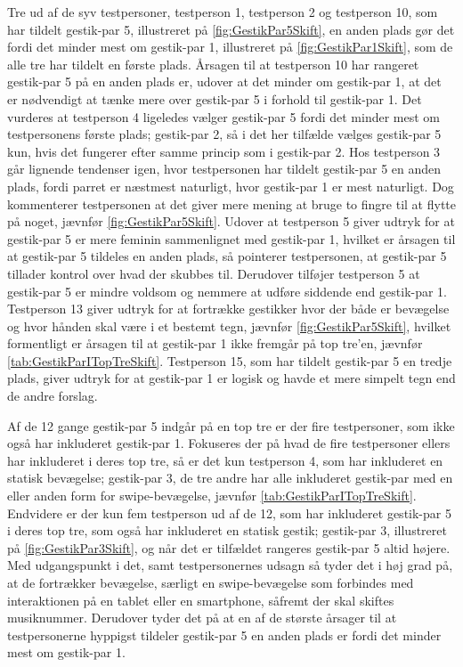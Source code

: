 Tre ud af de syv testpersoner, testperson 1, testperson 2 og testperson 10, som har tildelt gestik-par 5, illustreret på \autoref{fig:GestikPar5Skift}, en anden plads gør det fordi det minder mest om gestik-par 1, illustreret på \autoref{fig:GestikPar1Skift}, som de alle tre har tildelt en første plads. Årsagen til at testperson 10 har rangeret gestik-par 5 på en anden plads er, udover at det minder om gestik-par 1, at det er nødvendigt at tænke mere over gestik-par 5 i forhold til gestik-par 1. Det vurderes at testperson 4 ligeledes vælger gestik-par 5 fordi det minder mest om testpersonens første plads; gestik-par 2, så i det her tilfælde vælges gestik-par 5 kun, hvis det fungerer efter samme princip som i gestik-par 2. Hos testperson 3 går lignende tendenser igen, hvor testpersonen har tildelt gestik-par 5 en anden plads, fordi parret er næstmest naturligt, hvor gestik-par 1 er mest naturligt. Dog kommenterer testpersonen at det giver mere mening at bruge to fingre til at flytte på noget, jævnfør \autoref{fig:GestikPar5Skift}. Udover at testperson 5 giver udtryk for at gestik-par 5 er mere feminin sammenlignet med gestik-par 1, hvilket er årsagen til at gestik-par 5 tildeles en anden plads, så pointerer testpersonen, at gestik-par 5 tillader kontrol over hvad der skubbes til. Derudover tilføjer testperson 5 at gestik-par 5 er mindre voldsom og nemmere at udføre siddende end gestik-par 1. Testperson 13 giver udtryk for at fortrække gestikker hvor der både er bevægelse og hvor hånden skal være i et bestemt tegn, jævnfør \autoref{fig:GestikPar5Skift}, hvilket formentligt er årsagen til at gestik-par 1 ikke fremgår på top tre'en, jævnfør \autoref{tab:GestikParITopTreSkift}. Testperson 15, som har tildelt gestik-par 5 en tredje plads, giver udtryk for at gestik-par 1 er logisk og havde et mere simpelt tegn end de andre forslag. 

Af de 12 gange gestik-par 5 indgår på en top tre er der fire testpersoner, som ikke også har inkluderet gestik-par 1. Fokuseres der på hvad de fire testpersoner ellers har inkluderet i deres top tre, så er det kun testperson 4, som har inkluderet en statisk bevægelse; gestik-par 3, de tre andre har alle inkluderet gestik-par med en eller anden form for swipe-bevægelse, jævnfør \autoref{tab:GestikParITopTreSkift}. Endvidere er der kun fem testperson ud af de 12, som har inkluderet gestik-par 5 i deres top tre, som også har inkluderet en statisk gestik; gestik-par 3, illustreret på \autoref{fig:GestikPar3Skift}, og når det er tilfældet rangeres gestik-par 5 altid højere. Med udgangspunkt i det, samt testpersonernes udsagn så tyder det i høj grad på, at de fortrækker bevægelse, særligt en swipe-bevægelse som forbindes med interaktionen på en tablet eller en smartphone, såfremt der skal skiftes musiknummer. Derudover tyder det på at en af de største årsager til at testpersonerne hyppigst tildeler gestik-par 5 en anden plads er fordi det minder mest om gestik-par 1.

